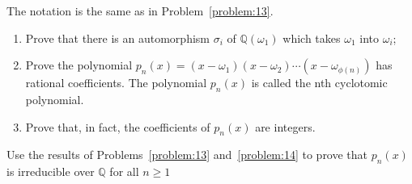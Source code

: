 \begin{problem}\label{problem:14}
The notation is the same as in Problem~\ref{problem:13}.
\begin{enumerate}
	\item Prove that there is an automorphism $\sigma_{i}$ of
	      $\mathbb{Q}(\omega_{1})$ which takes $\omega_{1}$ into $\omega_{i}$;
	\item Prove the polynomial
	      $p_{n}(x)=(x-\omega_{1})(x-\omega_{2})\cdots(x-\omega_{\phi(n)})$ has
	      rational coefficients. The polynomial $p_{n}(x)$ is called the nth
	      cyclotomic polynomial.
	\item Prove that, in fact, the coefficients of $p_{n}(x)$ are integers.
\end{enumerate}
\end{problem}

\begin{problem}
Use the results of Problems~\ref{problem:13} and~\ref{problem:14} to prove that
$p_{n}(x)$ is irreducible over $\mathbb{Q}$ for all $n\geqslant{1}$
\end{problem}
